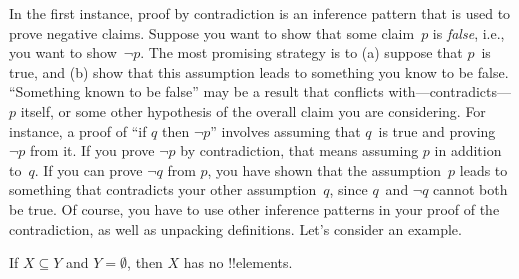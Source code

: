 \documentclass[../../../include/open-logic-section]{subfiles}
\begin{document}


In the first instance, proof by contradiction is an inference pattern
that is used to prove negative claims.  Suppose you want to show that
some claim~$p$ is \emph{false}, i.e., you want to show~$\lnot p$.  The
most promising strategy is to (a) suppose that $p$~is true, and (b)
show that this assumption leads to something you know to be false.
``Something known to be false'' may be a result that conflicts
with---contradicts---$p$ itself, or some other hypothesis of the
overall claim you are considering.  For instance, a proof of ``if $q$
then $\lnot p$'' involves assuming that $q$~is true and proving~$\lnot
p$ from it. If you prove $\lnot p$ by contradiction, that means
assuming $p$ in addition to~$q$. If you can prove $\lnot q$ from $p$,
you have shown that the assumption~$p$ leads to something that
contradicts your other assumption~$q$, since $q$~and $\lnot q$ cannot
both be true.  Of course, you have to use other inference patterns in
your proof of the contradiction, as well as unpacking definitions.
Let's consider an example.

\begin{prop}
  If $X \subseteq Y$ and $Y = \emptyset$, then $X$ has no !!{element}s.
\end{prop}
\end{document}
